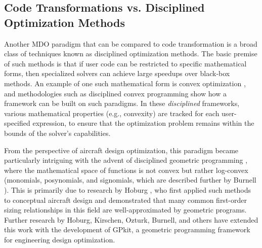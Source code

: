 \subsection{Code Transformations vs. Disciplined Optimization Methods}
\label{sec:benchmark_gpkit}

Another MDO paradigm that can be compared to code transformation is a broad class of techniques known as disciplined optimization methods. The basic premise of such methods is that if user code can be restricted to specific mathematical forms, then specialized solvers can achieve large speedups over black-box methods. An example of one such mathematical form is convex optimization \cite{boyd_convex_2004}, and methodologies such as disciplined convex programming \cite{grant_disciplined_2006} show how a framework can be built on such paradigms. In these \emph{disciplined} frameworks, various mathematical properties (e.g., convexity) are tracked for each user-specified expression, to ensure that the optimization problem remains within the bounds of the solver's capabilities.

From the perspective of aircraft design optimization, this paradigm became particularly intriguing with the advent of disciplined geometric programming \cite{boyd_tutorial_2007, agrawal_disciplined_2019}, where the mathematical space of functions is not convex but rather log-convex (monomials, posynomials, and signomials, which are described further by Burnell \cite{gpkit}). This is primarily due to research by Hoburg \cite{hoburg_geometric_2014}, who first applied such methods to conceptual aircraft design and demonstrated that many common first-order sizing relationships in this field are well-approximated by geometric programs. Further research by Hoburg, Kirschen, Ozturk, Burnell, and others \cite{kirschen, geometric, jho} have extended this work with the development of GPkit, a geometric programming framework for engineering design optimization.


